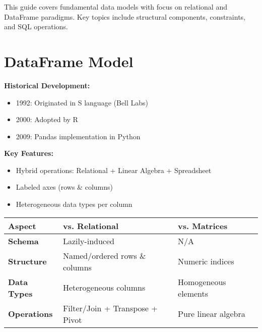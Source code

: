 \documentclass[12pt]{article}
\begin{document}
\begin{tcolorbox}[colback=blue!5!white,colframe=blue!75!black,title=Module Overview]
This guide covers fundamental data models with focus on relational and DataFrame paradigms. Key topics include structural components, constraints, and SQL operations.
\end{tcolorbox}

\section{DataFrame Model}
\begin{tcolorbox}[colback=yellow!5!white,colframe=yellow!75!black,title=Core Concepts]
\textbf{Historical Development:}
\begin{itemize}
    \item 1992: Originated in S language (Bell Labs)
    \item 2000: Adopted by R
    \item 2009: Pandas implementation in Python
\end{itemize}

\textbf{Key Features:}
\begin{itemize}
    \item Hybrid operations: Relational + Linear Algebra + Spreadsheet
    \item Labeled axes (rows \& columns)
    \item Heterogeneous data types per column
\end{itemize}
\end{tcolorbox}

\begin{tcolorbox}[colback=green!5!white,colframe=green!75!black,title=Comparative Analysis]
\renewcommand{\arraystretch}{1.5}
\begin{tabular}{>{\bfseries}l p{5cm} p{5cm}}
  \textbf{Aspect} & \textbf{vs. Relational} & \textbf{vs. Matrices} \\ \hline
  Schema & Lazily-induced & N/A \\
  Structure & Named/ordered rows \& columns & Numeric indices \\
  Data Types & Heterogeneous columns & Homogeneous elements \\
  Operations & Filter/Join + Transpose + Pivot & Pure linear algebra \\
\end{tabular}
\end{tcolorbox}
\end{document}
